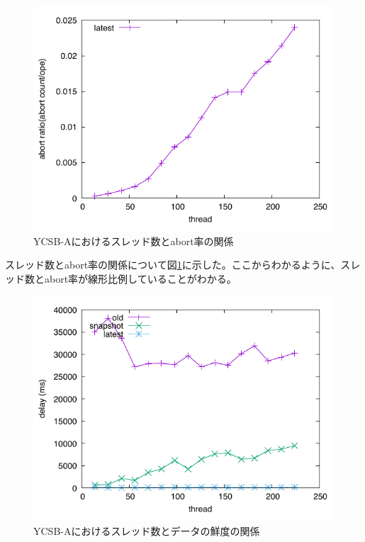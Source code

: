 \documentclass[a4paper]{jreport}	%
\begin{document}
\begin{figure}[h] 
\centering
\includegraphics[width=15cm]{ycsb-a/opposite-abort}
\caption{YCSB-Aにおけるスレッド数とabort率の関係}
\label{fig:a-abort}
\end{figure}

スレッド数とabort率の関係について図\ref{fig:a-abort}に示した。ここからわかるように、スレッド数とabort率が線形比例していることがわかる。


\begin{figure}[h] 
\centering
\includegraphics[width=15cm]{ycsb-a/opposite-delay}
\caption{YCSB-Aにおけるスレッド数とデータの鮮度の関係}
\label{fig:a-delay}
\end{figure}
\end{document}
